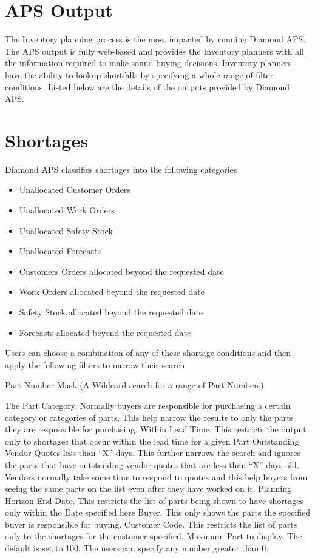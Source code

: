 \section{APS Output}
The Inventory planning process is the most impacted by running Diamond APS. The APS output is fully web-based and provides the Inventory planners with all the information required to make sound buying decisions. Inventory planners have the ability to lookup shortfalls by specifying a whole range of filter conditions. Listed below are the details of the outputs provided by Diamond APS.

\section{Shortages}
Diamond APS classifies shortages into the following categories
\begin{itemize}
\item Unallocated Customer Orders
\item Unallocated Work Orders
\item Unallocated Safety Stock
\item Unallocated Forecasts
\item Customers Orders allocated beyond the requested date
\item Work Orders allocated beyond the requested date
\item Safety Stock allocated beyond the requested date
\item Forecasts allocated beyond the requested date
\end{itemize}
Users can choose a combination of any of these shortage conditions and then apply the following filters to narrow their search

Part Number Mask (A Wildcard search for a range of Part Numbers)

The Part Category. Normally buyers are responsible for purchasing a certain category or categories of parts. This help narrow the results to only the parts they are responsible for purchasing. Within Lead Time. This restricts the output only to shortages that occur within the lead time for a given Part
Outstanding Vendor Quotes less than “X” days. This further narrows the search and ignores the parts that have outstanding vendor quotes that are less than “X” days old. Vendors normally take some time to respond to quotes and this help buyers from seeing the same parts on the list even after they have worked on it.
Planning Horizon End Date. This restricts the list of parts being shown to have shortages only within the Date specified here
Buyer. This only shows the parts the specified buyer is responsible for buying.
Customer Code. This restricts the list of parts only to the shortages for the customer specified.
Maximum Part to display. The default is set to 100. The users can specify any number greater than 0.

